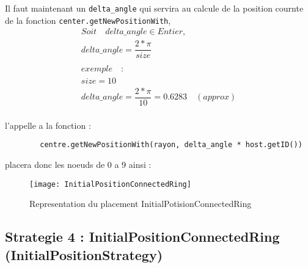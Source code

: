 \documentclass[11pt,a4paper,sans]{report}
\begin{document}
	Il faut maintenant un \texttt{delta\_angle} qui servira au calcule de la position cournte de la fonction \texttt{center.getNewPositionWith},
	\begin{gather}
		Soit \quad delta\_angle \in Entier, \\
		delta\_angle = \dfrac{2 * \pi}{size} \\ 
		\\
		exemple \quad : \\ 
		size = 10 \\
		delta\_angle = \dfrac{2 * \pi}{10} = 0.6283 \quad(approx)\\ 
	\end{gather}

	\par l'appelle a la fonction  :
	\begin{lstlisting}
		centre.getNewPositionWith(rayon, delta_angle * host.getID())
	\end{lstlisting}
	\par placera donc les noeuds de 0 a 9 ainsi :
	\begin{figure}[H]
		\centering
		\texttt{[image: InitialPositionConnectedRing]}
		\caption{Representation du placement InitialPotisionConnectedRing}
		\label{fig:mesh1}
	\end{figure}



	\subsection*{Strategie 4 : InitialPositionConnectedRing (InitialPositionStrategy)}
\end{document}
